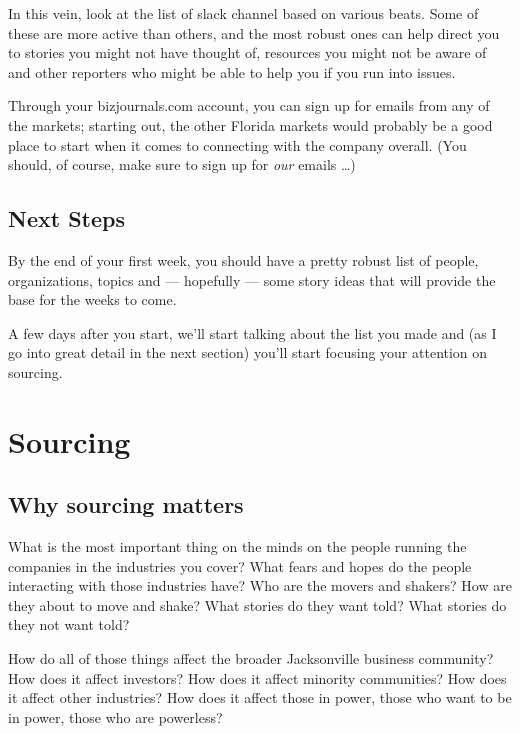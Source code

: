 \documentclass[
  11pt,
  american,
  letterpaperpaper,
  extrafontsizes,onecolumn,openright
  ]{memoir}
\begin{document}
In this vein, look at the list of slack channel based on various beats. Some of these are more active than others, and the most robust ones can help direct you to stories you might not have thought of, resources you might not be aware of and other reporters who might be able to help you if you run into issues.

Through your bizjournals.com account, you can sign up for emails from any of the markets; starting out, the other Florida markets would probably be a good place to start when it comes to connecting with the company overall. (You should, of course, make sure to sign up for \emph{our} emails \ldots)

\hypertarget{next-steps}{%
\section*{Next Steps}\label{next-steps}}

By the end of your first week, you should have a pretty robust list of people, organizations, topics and --- hopefully --- some story ideas that will provide the base for the weeks to come.

A few days after you start, we'll start talking about the list you made and (as I go into great detail in the next section) you'll start focusing your attention on sourcing.

\hypertarget{sourcing}{%
\chapter{Sourcing}\label{sourcing}}

\hypertarget{why-sourcing-matters}{%
\section*{Why sourcing matters}\label{why-sourcing-matters}}

What is the most important thing on the minds on the people running the companies in the industries you cover? What fears and hopes do the people interacting with those industries have? Who are the movers and shakers? How are they about to move and shake? What stories do they want told? What stories do they not want told?

How do all of those things affect the broader Jacksonville business community? How does it affect investors? How does it affect minority communities? How does it affect other industries? How does it affect those in power, those who want to be in power, those who are powerless?
\end{document}
